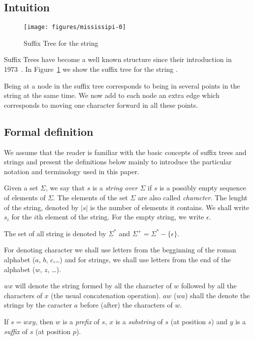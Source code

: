 
\subsection{Intuition}

\begin{figure}
\texttt{[image: figures/mississipi-0]}
\caption{Suffix Tree for the string }%
\label{fig:mississipi-0}
\end{figure}

Suffix Trees have become a well known structure since their introduction in 1973~\cite{weiner}. In Figure~\ref{fig:mississipi-0} we show the suffix tree for the string .

Being at a node in the suffix tree corresponds to being in several points in the string at the same time. We now add to each node an extra edge which corresponds to moving one character forward in all these points.

\subsection{Formal definition}

We assume that the reader is familiar with the basic concepts of suffix trees and strings and present the definitions below mainly to introduce the particular notation and terminology used in this paper.

\begin{definition}
Given a set $\Sigma$, we say that $s$ is a \emph{string over $\Sigma$} if $s$ is a possibly empty sequence of elements of $\Sigma$. The elements of the set $\Sigma$ are also called \emph{character}. The lenght of the string, denoted by $|s|$ is the number of elements it contains. We shall write $s_i$ for the $i$th element of the string. For the empty string, we write $\epsilon$.

The set of all string is denoted by $\Sigma^*$ and $\Sigma^+=\Sigma^*-\{\epsilon\}$.
\end{definition}

For denoting character we shall use letters from the begginning of the roman alphabet ($a$, $b$, $c$,\ldots) and for strings, we shall use letters from the end of the alphabet ($w$, $z$, \ldots).

\begin{definition}
$wx$ will denote the string formed by all the character of $w$ followed by all the characters of $x$ (the usual concatenation operation). $aw$ ($wa$) shall the denote the strings by the caracter $a$ before (after) the characters of $w$.

If $s = wxy$, then $w$ is a \emph{prefix} of $s$, $x$ is a \emph{substring} of $s$ (at position $s$) and $y$ is a \emph{suffix} of $s$ (at position $p$).
\end{definition}

